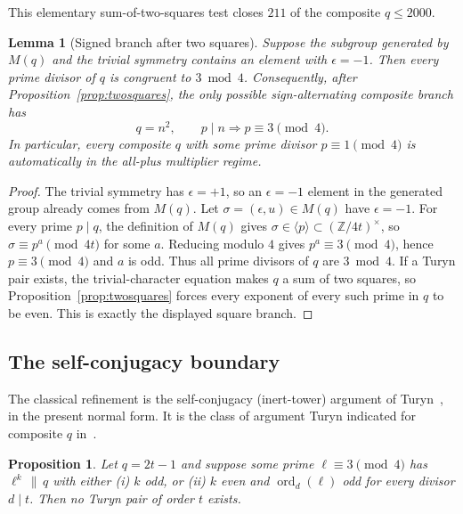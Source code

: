 \documentclass[11pt]{article}
\theoremstyle{plain}
\newtheorem{lemma}[theorem]{Lemma}
\newtheorem{proposition}[theorem]{Proposition}
\theoremstyle{definition}
\theoremstyle{remark}
\newcommand{\Z}{\mathbb Z}
\newcommand{\ord}{\operatorname{ord}}
\begin{document}
This elementary sum-of-two-squares test closes $211$ of the composite $q\le2000$.

\begin{lemma}[Signed branch after two squares]\label{lem:signed-branch-reduction}
Suppose the subgroup generated by $M(q)$ and the trivial symmetry contains an
element with $\epsilon=-1$.  Then every prime divisor of $q$ is congruent to
$3\bmod4$.  Consequently, after Proposition~\ref{prop:twosquares}, the only
possible sign-alternating composite branch has
\[
  q=n^2,\qquad p\mid n\Rightarrow p\equiv3\pmod4 .
\]
In particular, every composite $q$ with some prime divisor $p\equiv1\pmod4$
is automatically in the all-plus multiplier regime.
\end{lemma}

\begin{proof}
The trivial symmetry has $\epsilon=+1$, so an $\epsilon=-1$ element in the
generated group already comes from $M(q)$.  Let
$\sigma=(\epsilon,u)\in M(q)$ have $\epsilon=-1$.  For every prime $p\mid q$,
the definition of $M(q)$ gives $\sigma\in\langle p\rangle\subset(\Z/4t)^\times$,
so $\sigma\equiv p^a\pmod{4t}$ for some $a$.  Reducing modulo $4$ gives
$p^a\equiv3\pmod4$, hence $p\equiv3\pmod4$ and $a$ is odd.  Thus all prime
divisors of $q$ are $3\bmod4$.  If a Turyn pair exists, the trivial-character
equation makes $q$ a sum of two squares, so Proposition~\ref{prop:twosquares}
forces every exponent of every such prime in $q$ to be even.  This is exactly
the displayed square branch.
\end{proof}

\subsection{The self-conjugacy boundary}\label{sec:selfconj}

The classical refinement is the self-conjugacy (inert-tower) argument of
Turyn~\cite{Turyn65,Turyn68}, in the present normal form. It is the class of
argument Turyn indicated for composite $q$ in~\cite{Turyn72}.

\begin{proposition}\label{prop:selfconj}
Let $q=2t-1$ and suppose some prime $\ell\equiv3\pmod4$ has $\ell^k\,\|\,q$ with
either \emph{(i)} $k$ odd, or \emph{(ii)} $k$ even and $\ord_d(\ell)$ odd for
every divisor $d\mid t$. Then no Turyn pair of order $t$ exists.
\end{proposition}
\end{document}
